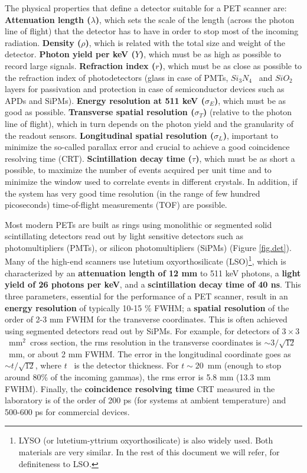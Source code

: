 \documentclass[review]{elsarticle}
\begin{document}
The physical properties that define a detector suitable for a PET scanner are: 
{\bf Attenuation length ($\lambda$)}, which sets the scale of the length (across the photon line of flight) that the detector has to have in order to stop most of the incoming radiation.
{\bf Density ($\rho$)}, which is related with the total size and weight of the detector.
{\bf Photon yield per keV ($Y$)}, which must be as high as possible to record large signals. 
{\bf Refraction index ($r$)}, which must be as close as possible to the refraction index of photodetectors (glass in case of PMTs, $Si_3N_4$~ and $SiO_2$ layers for passivation and protection in case of semiconductor devices such as APDs and SiPMs). 
{\bf Energy resolution at 511 keV ($\sigma_E$)}, which must be as good as possible. 
{\bf Transverse spatial resolution ($\sigma_T$)} (relative to the photon line of flight), which in turn depends on the photon yield and the granularity of the readout sensors.
{\bf Longitudinal spatial resolution ($\sigma_L$)}, important to minimize the so-called parallax error and crucial to achieve a good coincidence resolving time (CRT).   
{\bf Scintillation decay time ($\tau$)}, which must be as short a possible, to maximize the number of events acquired per unit time and to minimize the window used to correlate events in different crystals. In addition, if the system has very good time resolution (in the range of few hundred picoseconds) time-of-flight measurements (TOF) are possible. 

Most modern PETs are built as rings using monolithic or segmented solid scintillating detectors read out by light sensitive detectors such as photomultipliers (PMTs), or silicon photomultipliers (SiPMs) (Figure \ref{fig.det}). Many of the high-end scanners use lutetium oxyorthosilicate (LSO)\footnote{LYSO (or lutetium-yttrium oxyorthosilicate) is also widely used. Both materials are very similar. In the rest of this document we will refer, for definiteness to LSO.}, which is characterized by an {\bf attenuation length of 12 mm} to 511 keV photons, a  {\bf light yield of 26 photons per keV}, and a {\bf scintillation decay time of 40 ns}. This three parameters, essential for the performance of a PET scanner, result in an {\bf energy resolution} of typically 10-15 \% FWHM; a {\bf spatial resolution} of the order of 2-3 mm FWHM for the transverse coordinates. This is often achieved using segmented detectors read out by SiPMs. For example, for detectors of $3 \times 3$~mm$^2$~cross section, the rms resolution in the transverse coordinates is $\sim 3/\sqrt{12}$~mm, or about 2 mm FWHM. The error in 
the longitudinal coordinate goes as $\sim t/\sqrt{12}$, where $t$~ is the detector thickness. For $t \sim 20$~mm (enough to stop around 80\% of the incoming gammas), the rms error is 5.8 mm (13.3 mm FWHM). Finally, the {\bf coincidence resolving time} CRT measured in the laboratory is of the order of 200 ps (for systems at ambient temperature) and 500-600 ps for commercial devices.
\end{document}
